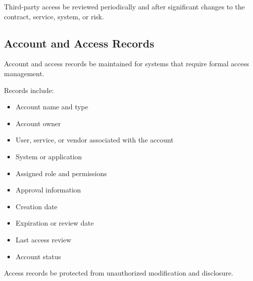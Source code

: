 Third-party access \must{} be reviewed periodically and after significant changes to the contract, service, system, or risk.

\subsection{Account and Access Records}

Account and access records \must{} be maintained for systems that require formal access management.

Records \should{} include:
\begin{itemize}
    \item Account name and type
    \item Account owner
    \item User, service, or vendor associated with the account
    \item System or application
    \item Assigned role and permissions
    \item Approval information
    \item Creation date
    \item Expiration or review date
    \item Last access review
    \item Account status
\end{itemize}

Access records \must{} be protected from unauthorized modification and disclosure.